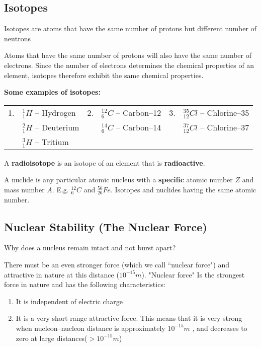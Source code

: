 \subsection{Isotopes}
\begin{defi}[Isotopes]
Isotopes are atoms that have the same number of protons but different number of neutrons
\end{defi}
Atoms that have the same number of protons will also have the same number of electrons. Since the number of electrons determines the chemical properties of an element, isotopes therefore exhibit the same chemical properties.

\textbf{Some examples of isotopes:}

\begin{tabular}{|l l | l  l| l  l|}
\hline
1. & $^1_1 H$ -- Hydrogen & 2. & $^{12}_6 C$ -- Carbon--12 & 3. & $^{35}_{12} Cl$ -- Chlorine--35\\[5pt]
 & $^2_1 H$ -- Deuterium & & $^{14}_6 C$ -- Carbon--14 & & $^{37}_{12} Cl$ -- Chlorine--37\\  [5pt]
 & $^3_1 H$ -- Tritium & & & &\\
 \hline
\end{tabular}

A \textbf{radioisotope} is an isotope of an element that is \textbf{radioactive}.

A nuclide is any particular atomic nucleus with a \textbf{specific} atomic number $Z$ and mass number $A$. E.g. $^{12}_6 C$ and $^{56}_{26}Fe$. Isotopes and nuclides having the same atomic number.

\subsection{Nuclear Stability (The Nuclear Force)}

Why does a nucleus remain intact and not burst apart?

There must be an even stronger force (which we call ``nuclear force") and attractive in nature at this distance ($10^{-15}m$). "Nuclear force" Is the strongest force in nature and has the following characteristics:

\begin{enumerate}
\item It is independent of electric charge
\item It is a very short range attractive force. This means that it is very strong when nucleon--nucleon distance is approximately $10^{-15}m$ , and decreases to zero at large distances($> 10^{-15}m$)
\end{enumerate}

